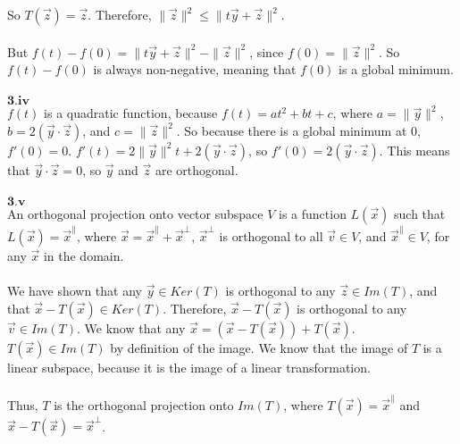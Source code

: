 \documentclass[letterpaper,12pt]{article}
\begin{document}
So $T(\vec{z}) = \vec{z}$. Therefore, $\| \vec{z} \|^2 \leq \| t \vec{y} + \vec{z} \| ^2$.
\\
\\But $f(t) - f(0) = \| t \vec{y} + \vec{z} \| ^2 - \| \vec{z} \|^2$, since $f(0) = \| \vec{z} \| ^2$. So $f(t) - f(0)$ is always
non-negative, meaning that $f(0)$ is a global minimum.
\\
\\$\mathbf{3.iv}$
\\$f(t)$ is a quadratic function, because $f(t) = a t^2 + b  t + c$, where $a = \| \vec{y} \| ^2$, $b = 2(\vec{y} \cdot \vec{z})$, and 
$c = \| \vec{z} \| ^2$. So because there is a global minimum at $0$, $f'(0) = 0$.
$f'(t) = 2 \|\vec{y}\|^2 t + 2(\vec{y} \cdot \vec{z})$, so $f'(0) = 2 (\vec{y} \cdot \vec{z})$. This means that
$\vec{y} \cdot \vec{z} = 0$, so $\vec{y}$ and $\vec{z}$ are orthogonal.
\\
\\$\mathbf{3.v}$
\\
An orthogonal projection onto vector subspace $V$ is a function $L(\vec{x})$ such that $L(\vec{x}) = \vec{x}^{\parallel}$, where
$\vec{x} = \vec{x}^{\parallel} + \vec{x}^{\perp}$, $\vec{x}^{\perp}$ is orthogonal to all $\vec{v} \in V$, 
and $\vec{x}^{\parallel} \in V$, for any $\vec{x}$ in the domain.
\\\\We have shown that any $\vec{y} \in Ker(T)$ is orthogonal to any $\vec{z} \in Im(T)$, and that $\vec{x} - T(\vec{x}) \in Ker(T)$.
Therefore, $\vec{x} - T(\vec{x})$ is orthogonal to any $\vec{v} \in Im(T)$. We know that any $\vec{x} = (\vec{x} - T(\vec{x})) + T(\vec{x})$. $T(\vec{x}) \in Im(T)$ by definition of the image.
We know that the image of $T$ is a linear subspace, because it is the image of a linear
transformation.
\\
\\Thus, $T$ is the orthogonal projection onto $Im(T)$, where $T(\vec{x}) = \vec{x}^{\parallel}$ and $\vec{x} - T(\vec{x}) = \vec{x}^{\perp}$.
\end{document}

